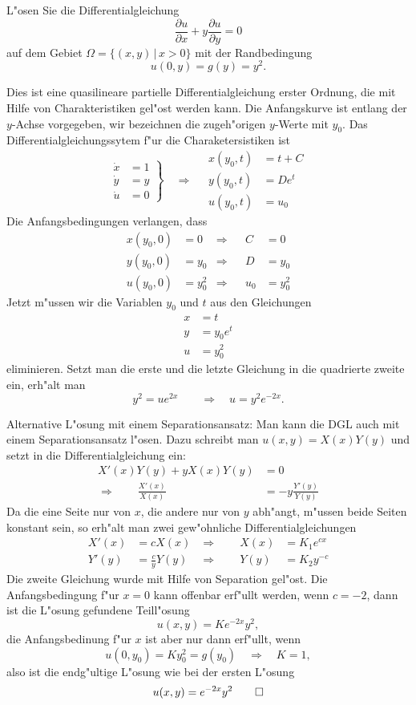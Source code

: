 L"osen Sie die Differentialgleichung
\[
\frac{\partial u}{\partial x}+y\frac{\partial u}{\partial y}=0
\]
auf dem Gebiet $\Omega=\{(x,y)\,|\, x> 0\}$ mit der Randbedingung
\[
u(0,y)=g(y)=y^2.
\]

\begin{loesung}
Dies ist eine quasilineare partielle Differentialgleichung
erster Ordnung, die mit Hilfe von Charakteristiken gel"ost werden
kann.
Die Anfangskurve ist entlang der $y$-Achse vorgegeben, wir bezeichnen
die zugeh"origen $y$-Werte mit $y_0$.
Das Differentialgleichungssytem f"ur die  Charaketersistiken ist
\[
\left.
\begin{aligned}
\dot x&=1\\
\dot y&=y\\
\dot u&=0
\end{aligned}
\right\}\quad\Rightarrow\quad
\begin{aligned}
x(y_0,t)&=t+C\\
y(y_0,t)&=De^t\\
u(y_0,t)&=u_0
\end{aligned}
\]
Die Anfangsbedingungen verlangen, dass
\begin{align*}
x(y_0,0)&=0&\Rightarrow&&C&=0\\
y(y_0,0)&=y_0&\Rightarrow&&D&=y_0\\
u(y_0,0)&=y_0^2&\Rightarrow&&u_0&=y_0^2
\end{align*}
Jetzt m"ussen wir die Variablen $y_0$ und $t$ aus den Gleichungen
\begin{align*}
x&=t\\
y&=y_0e^t\\
u&=y_0^2
\end{align*}
eliminieren. Setzt man die erste und die letzte Gleichung in die
quadrierte zweite ein, erh"alt man
\[
y^2=ue^{2x}\qquad\Rightarrow\quad u=y^2e^{-2x}.
\]

Alternative L"osung mit einem Separationsansatz: Man kann die DGL auch
mit einem Separationsansatz l"osen. Dazu schreibt man $u(x,y)=X(x)Y(y)$
und setzt in die Differentialgleichung ein:
\begin{align*}
X'(x)Y(y)+yX(x)Y(y)&=0\\
\Rightarrow\qquad \frac{X'(x)}{X(x)}&=-y\frac{Y'(y)}{Y(y)}
\end{align*}
Da die eine Seite nur von $x$, die andere nur von $y$ abh"angt, m"ussen
beide Seiten konstant sein, so erh"alt man zwei gew"ohnliche
Differentialgleichungen
\begin{align*}
X'(x)&=cX(x)&\Rightarrow\qquad X(x)&=K_1e^{cx}\\
Y'(y)&=\frac{c}{y}Y(y)&\Rightarrow\qquad Y(y)&=K_2y^{-c}
\end{align*}
Die zweite Gleichung wurde mit Hilfe von Separation gel"ost.
Die Anfangsbedingung f"ur $x=0$ kann offenbar erf"ullt werden,
wenn $c=-2$, dann ist die L"osung gefundene Teill"osung
\[
u(x,y)=Ke^{-2x}y^2,
\]
die Anfangsbedinung f"ur $x$ ist aber nur dann erf"ullt, wenn
\[
u(0,y_0)=Ky_0^2=g(y_0)\quad\Rightarrow\quad K=1,
\]
also ist die endg"ultige L"osung wie bei der ersten L"osung
\[
u(x,y)=e^{-2x}y^2
\qedhere
\]
\end{loesung}
